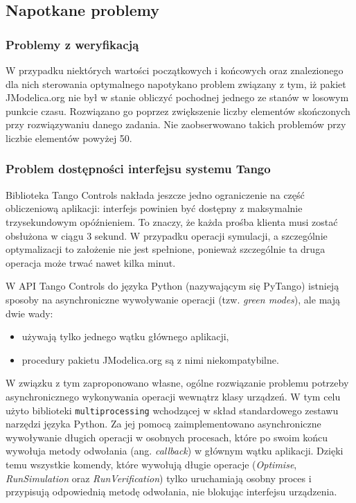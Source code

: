 \subsection{Napotkane problemy}
\label{sub:sym-problems}

\subsubsection{Problemy z weryfikacją}

W przypadku niektórych wartości początkowych i końcowych oraz znalezionego dla nich sterowania optymalnego napotykano problem związany z tym, iż pakiet JModelica.org nie był w stanie obliczyć pochodnej jednego ze stanów w losowym punkcie czasu. Rozwiązano go poprzez zwiększenie liczby elementów skończonych przy rozwiązywaniu danego zadania. Nie zaobserwowano takich problemów przy liczbie elementów powyżej 50.

\subsubsection{Problem dostępności interfejsu systemu Tango}

Biblioteka Tango Controls nakłada jeszcze jedno ograniczenie na część obliczeniową aplikacji: interfejs powinien być dostępny z maksymalnie trzysekundowym opóźnieniem. To znaczy, że każda prośba klienta musi zostać obsłużona w ciągu 3 sekund. W przypadku operacji symulacji, a szczególnie optymalizacji to założenie nie jest spełnione, ponieważ szczególnie ta druga operacja może trwać nawet kilka minut.

W API Tango Controls do języka Python (nazywającym się PyTango) istnieją sposoby na asynchroniczne wywoływanie operacji (tzw. \emph{green modes}), ale mają dwie wady:
\begin{itemize}
    \item używają tylko jednego wątku głównego aplikacji,
    \item procedury pakietu JModelica.org są z nimi niekompatybilne.
\end{itemize}

W związku z tym zaproponowano własne, ogólne rozwiązanie problemu potrzeby asynchronicznego wykonywania operacji wewnątrz klasy urządzeń. W tym celu użyto biblioteki \texttt{multiprocessing} wchodzącej w skład standardowego zestawu narzędzi języka Python. Za jej pomocą zaimplementowano asynchroniczne wywoływanie długich operacji w osobnych procesach, które po swoim końcu wywołuja metody odwołania (ang. \emph{callback}) w głównym wątku aplikacji. Dzięki temu wszystkie komendy, które wywołują długie operacje (\emph{Optimise}, \emph{RunSimulation} oraz \emph{RunVerification}) tylko uruchamiają osobny proces i przypisują odpowiednią metodę odwołania, nie blokując interfejsu urządzenia.

